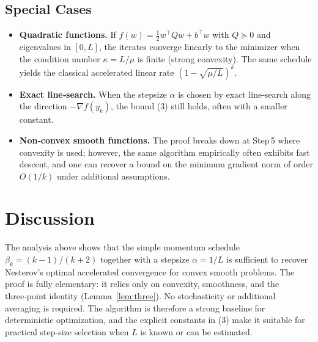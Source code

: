 \documentclass{article}
\begin{document}
\subsection*{Special Cases}
\begin{itemize}
\item \textbf{Quadratic functions.} If \(f(w)=\frac{1}{2}w^\top Q w+b^\top w\) with \(Q\succeq 0\) and eigenvalues in \([0,L]\), the iterates converge linearly to the minimizer when the condition number \(\kappa=L/\mu\) is finite (strong convexity). The same schedule yields the classical accelerated linear rate \((1-\sqrt{\mu/L})^{k}\).
\item \textbf{Exact line‑search.} When the stepsize \(\alpha\) is chosen by exact line‑search along the direction \(-\nabla f(y_k)\), the bound (3) still holds, often with a smaller constant.
\item \textbf{Non‑convex smooth functions.} The proof breaks down at Step 5 where convexity is used; however, the same algorithm empirically often exhibits fast descent, and one can recover a bound on the minimum gradient norm of order \(O(1/k)\) under additional assumptions.
\end{itemize}

\section*{Discussion}
The analysis above shows that the simple momentum schedule \(\beta_k=(k-1)/(k+2)\) together with a stepsize \(\alpha=1/L\) is sufficient to recover Nesterov’s optimal accelerated convergence for convex smooth problems. The proof is fully elementary: it relies only on convexity, smoothness, and the three‑point identity (Lemma~\ref{lem:three}). No stochasticity or additional averaging is required. The algorithm is therefore a strong baseline for deterministic optimization, and the explicit constants in (3) make it suitable for practical step‑size selection when \(L\) is known or can be estimated.
\end{document}
